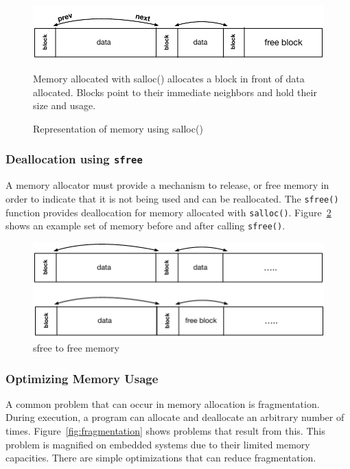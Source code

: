 \begin{figure}[!htb]
\includegraphics[scale=.55]{figs/stack.pdf}
\caption{Representation of memory using salloc()}
Memory allocated with salloc() allocates a block in front of data allocated. Blocks point to their immediate neighbors and hold their size and usage.
\label{fig:stack}
\end{figure}

\subsubsection{Deallocation using \texttt{sfree}}

A memory allocator must provide a mechanism to release, or free memory in order to indicate that it is not being used and can be reallocated. The \texttt{sfree()} function provides deallocation for memory allocated with \texttt{salloc()}. Figure~\ref{fig:free} shows an example set of memory before and after calling \texttt{sfree()}. 

\begin{figure}[!htb]
\includegraphics[scale=.55]{figs/sfree.pdf}
\caption{sfree to free memory}
\label{fig:free}
\end{figure}

\subsubsection{Optimizing Memory Usage}

A common problem that can occur in memory allocation is fragmentation. During execution, a program can allocate and deallocate an arbitrary number of times. Figure~\ref{fig:fragmentation} shows problems that result from this. This problem is magnified on embedded systems due to their limited memory capacities. There are simple optimizations that can reduce fragmentation. 

